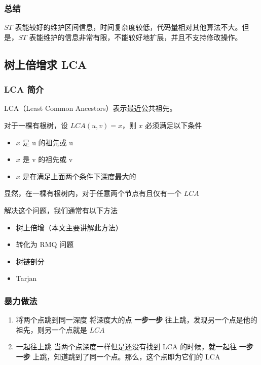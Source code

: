 \subsubsection{总结}

$ST$ 表能较好的维护区间信息，时间复杂度较低，代码量相对其他算法不大。但是，$ST$ 表能维护的信息非常有限，不能较好地扩展，并且不支持修改操作。

\subsection{树上倍增求 LCA}

\subsubsection{LCA 简介}

LCA（Least Common Ancestors）表示最近公共祖先。

对于一棵有根树，设 $LCA(u,v)=x$，则 $x$ 必须满足以下条件

\begin{itemize}
\item $x$ 是 u 的祖先或 u
\item $x$ 是 v 的祖先或 v
\item $x$ 是在满足上面两个条件下深度最大的
\end{itemize}

显然，在一棵有根树内，对于任意两个节点有且仅有一个 $LCA$

解决这个问题，我们通常有以下方法

\begin{itemize}
\item 树上倍增（本文主要讲解此方法）
\item 转化为 RMQ 问题
\item 树链剖分
\item Tarjan
\end{itemize}

\subsubsection{暴力做法}

\begin{enumerate}
\item 将两个点跳到同一深度
将深度大的点 \textbf{ 一步一步 } 往上跳，发现另一个点是他的祖先，则另一个点就是 $LCA$
\item 一起往上跳
当两个点深度一样但是还没有找到 LCA 的时候，就一起往 \textbf{ 一步一步 } 上跳，知道跳到了同一个点。那么，这个点即为它们的 LCA
\end{enumerate}

